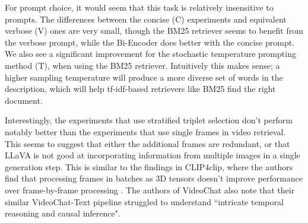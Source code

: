 For prompt choice, it would seem that this task is relatively insensitive to prompts.
The differences between the concise (C) experiments and equivalent verbose (V) ones are very small, though the BM25 retriever seems to benefit from the verbose prompt, while the Bi-Encoder does better with the concise prompt.
We also see a significant improvement for the stochastic temperature prompting method (T), when using the BM25 retriever.
Intuitively this makes sense; a higher sampling temperature will produce a more diverse set of words in the description, which will help tf-idf-based retrievers like BM25 find the right document.

Interestingly, the experiments that use stratified triplet selection don't perform notably better than the experiments that use single frames in video retrieval.
This seems to suggest that either the additional frames are redundant, or that LLaVA is not good at incorporating information from multiple images in a single generation step.
This is similar to the findings in CLIP4clip, where the authors find that processing frames in batches as 3D tensors doesn't improve performance over frame-by-frame processing \cite{clip4clip}.
The authors of VideoChat also note that their similar VideoChat-Text pipeline struggled to understand ``intricate temporal reasoning and causal inference".



